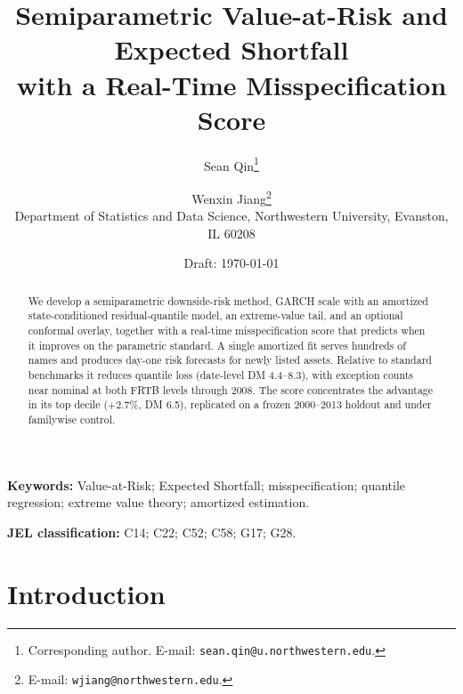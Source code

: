 \documentclass[11pt]{article}
\title{Semiparametric Value-at-Risk and Expected Shortfall\\
with a Real-Time Misspecification Score}
\author{%
  Sean Qin\thanks{Corresponding author. E-mail:
  \texttt{sean.qin@u.northwestern.edu}.}
  \and
  Wenxin Jiang\thanks{E-mail: \texttt{wjiang@northwestern.edu}.}\\[4pt]
  \normalsize Department of Statistics and Data Science, Northwestern
  University, Evanston, IL 60208}
\date{Draft: \today}
\theoremstyle{remark}
\begin{document}
\maketitle
\let\footnote\endnote

\begin{abstract}
We develop a semiparametric downside-risk method, GARCH scale with an
amortized state-conditioned residual-quantile model, an extreme-value
tail, and an optional conformal overlay, together with a real-time
misspecification score that predicts when it improves on the parametric
standard. A single amortized fit serves hundreds of names and produces
day-one risk forecasts for newly listed assets. Relative to standard
benchmarks it reduces quantile loss (date-level DM 4.4--8.3), with
exception counts near nominal at both FRTB levels through 2008. The
score concentrates the advantage in its top decile ($+2.7\%$, DM 6.5),
replicated on a frozen 2000--2013 holdout and under familywise
control.
\end{abstract}

\noindent\textbf{Keywords:} Value-at-Risk; Expected Shortfall;
misspecification; quantile regression; extreme value theory; amortized
estimation.

\medskip
\noindent\textbf{JEL classification:} C14; C22; C52; C58; G17; G28.

\section*{Introduction}\label{sec:intro}
\end{document}
